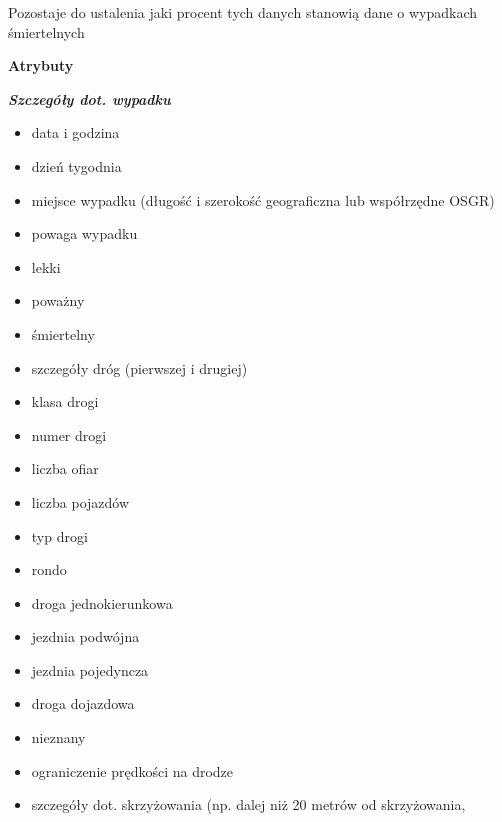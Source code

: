 Pozostaje do ustalenia jaki procent tych danych stanowią dane o
wypadkach śmiertelnych

\textbf{Atrybuty}

\textbf{\emph{Szczegóły dot. wypadku}}

\begin{itemize}
\itemsep-14pt\parskip0pt
\item
  data i godzina\\
\item
  dzień tygodnia\\
\item
  miejsce wypadku (długość i szerokość geograficzna lub współrzędne
  OSGR)\\
\item
  powaga wypadku\\
\item
  lekki\\
\item
  poważny\\
\item
  śmiertelny\\
\item
  szczegóły dróg (pierwszej i drugiej)\\
\item
  klasa drogi\\
\item
  numer drogi\\
\item
  liczba ofiar\\
\item
  liczba pojazdów\\
\item
  typ drogi\\
\item
  rondo\\
\item
  droga jednokierunkowa\\
\item
  jezdnia podwójna\\
\item
  jezdnia pojedyncza\\
\item
  droga dojazdowa\\
\item
  nieznany\\
\item
  ograniczenie prędkości na drodze\\
\item
  szczegóły dot. skrzyżowania (np. dalej niż 20 metrów od skrzyżowania,

\end{itemize}
